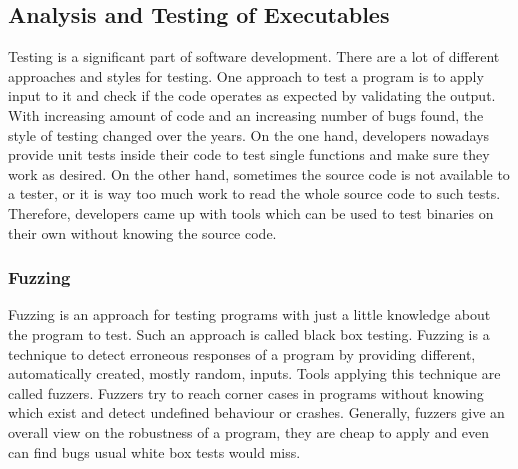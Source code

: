 \subsection{Analysis and Testing of Executables}

Testing is a significant part of software development. There are a lot of
different approaches and styles for testing. One approach to test a program is
to apply input to it and check if the code operates as expected by validating
the output. With increasing amount of code and an increasing number of bugs
found, the style of testing changed over the years. On the one hand, developers
nowadays provide unit tests inside their code to test single functions and make
sure they work as desired. On the other hand, sometimes the source code is not
available to a tester, or it is way too much work to read the whole source code
to such tests. Therefore, developers came up with tools which can be used to
test binaries on their own without knowing the source code.

\subsubsection{Fuzzing}

Fuzzing is an approach for testing programs with just a little knowledge about
the program to test. Such an approach is called black box testing. Fuzzing is a
technique to detect erroneous responses of a program by providing different,
automatically created, mostly random, inputs. Tools applying this technique are
called fuzzers. Fuzzers try to reach corner cases in programs without knowing
which exist and detect undefined behaviour or crashes. Generally, fuzzers give
an overall view on the robustness of a program, they are cheap to apply and even
can find bugs usual white box tests would miss.

